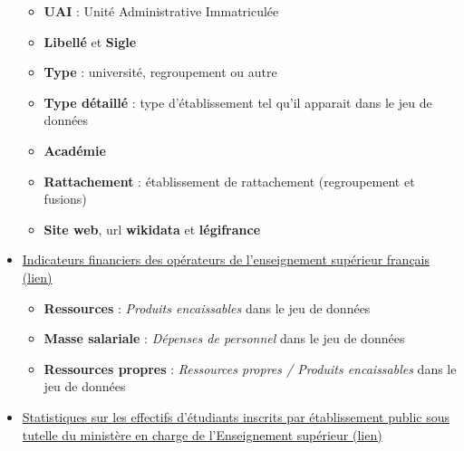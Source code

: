 \documentclass[11pt,french,landscape]{article}
\providecommand{\tightlist}{%
  \setlength{\itemsep}{0pt}\setlength{\parskip}{0pt}}
\begin{document}
\begin{multicols}{2}
\begin{itemize}
  \begin{itemize}
  \tightlist
  \item
    \textbf{UAI} : Unité Administrative Immatriculée
  \item
    \textbf{Libellé} et \textbf{Sigle}
  \item
    \textbf{Type} : université, regroupement ou autre
  \item
    \textbf{Type détaillé} : type d'établissement tel qu'il apparait
    dans le jeu de données
  \item
    \textbf{Académie}
  \item
    \textbf{Rattachement} : établissement de rattachement (regroupement
    et fusions)
  \item
    \textbf{Site web}, url \textbf{wikidata} et \textbf{légifrance}
  \end{itemize}
\item
  \href{https://data.enseignementsup-recherche.gouv.fr/explore/dataset/fr-esr-operateurs-indicateurs-financiers/}{Indicateurs
  financiers des opérateurs de l'enseignement supérieur français (lien)}

  \begin{itemize}
  \tightlist
  \item
    \textbf{Ressources} : \emph{Produits encaissables} dans le jeu de
    données
  \item
    \textbf{Masse salariale} : \emph{Dépenses de personnel} dans le jeu
    de données
  \item
    \textbf{Ressources propres} : \emph{Ressources propres / Produits
    encaissables} dans le jeu de données
  \end{itemize}
\item
  \href{https://data.enseignementsup-recherche.gouv.fr/explore/dataset/fr-esr-statistiques-sur-les-effectifs-d-etudiants-inscrits-par-etablissement/}{Statistiques
  sur les effectifs d'étudiants inscrits par établissement public sous
  tutelle du ministère en charge de l'Enseignement supérieur (lien)}


\end{itemize}
\end{multicols}
\end{document}
